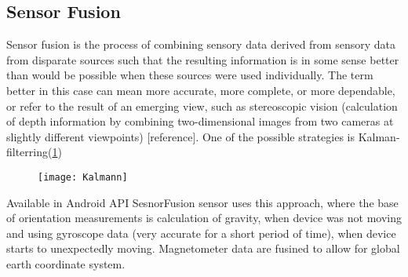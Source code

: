 \subsection{Sensor Fusion}
Sensor fusion is the process of  combining sensory data derived from sensory data from disparate
sources such that the resulting information is in some sense better than would be possible
when these sources were used individually. The term better in this case can mean more
accurate, more complete, or more dependable, or refer to the result of an emerging view, such
as stereoscopic vision (calculation of depth information by combining two-dimensional
images from two cameras at slightly different viewpoints) [reference]. One of the possible strategies is Kalman-filterring(\ref{fig:Kalmann})
\begin{figure}[p]
    \centering
    \texttt{[image: Kalmann]}
    \caption{}
    \label{fig:Kalmann}
\end{figure}
Available in Android API SesnorFusion sensor uses this approach, where the base of orientation measurements is calculation of gravity, when device was not moving and using gyroscope data (very accurate for a short period of time), when device starts to unexpectedly moving. Magnetometer data are fusined to allow for global earth coordinate system.


